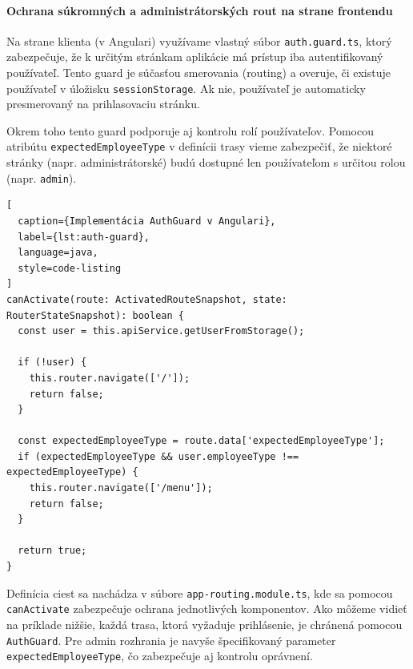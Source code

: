  \paragraph{Ochrana súkromných a administrátorských rout na strane frontendu}

Na strane klienta (v Angulari) využívame vlastný súbor \texttt{auth.guard.ts}, ktorý zabezpečuje, že k určitým stránkam aplikácie má prístup iba autentifikovaný používateľ. Tento guard je súčasťou smerovania (routing) a overuje, či existuje používateľ v úložisku \texttt{sessionStorage}. Ak nie, používateľ je automaticky presmerovaný na prihlasovaciu stránku.

Okrem toho tento guard podporuje aj kontrolu rolí používateľov. Pomocou atribútu \texttt{expectedEmployeeType} v definícii trasy vieme zabezpečiť, že niektoré stránky (napr. administrátorské) budú dostupné len používateľom s určitou rolou (napr. \texttt{admin}).

\begin{lstlisting}[
  caption={Implementácia AuthGuard v Angulari},
  label={lst:auth-guard},
  language=java,
  style=code-listing
]
canActivate(route: ActivatedRouteSnapshot, state: RouterStateSnapshot): boolean {
  const user = this.apiService.getUserFromStorage();

  if (!user) {
    this.router.navigate(['/']);
    return false;
  }

  const expectedEmployeeType = route.data['expectedEmployeeType'];
  if (expectedEmployeeType && user.employeeType !== expectedEmployeeType) {
    this.router.navigate(['/menu']);
    return false;
  }

  return true;
}
\end{lstlisting}

Definícia ciest sa nachádza v súbore \texttt{app-routing.module.ts}, kde sa pomocou \texttt{canActivate} zabezpečuje ochrana jednotlivých komponentov. Ako môžeme vidieť na príklade nižšie, každá trasa, ktorá vyžaduje prihlásenie, je chránená pomocou \texttt{AuthGuard}. Pre admin rozhrania je navyše špecifikovaný parameter \texttt{expectedEmployeeType}, čo zabezpečuje aj kontrolu oprávnení.

